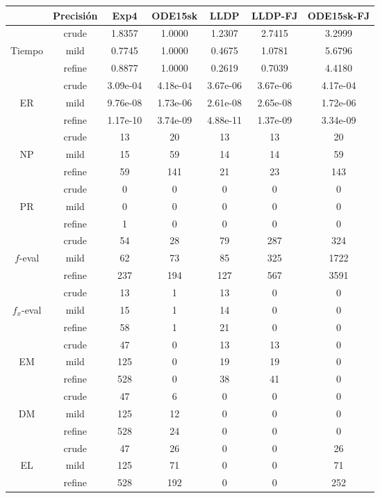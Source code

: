 \begin{table}[htb]
	\centering
\begin{tabular}{ |c|c|c|c|c|c|c| }
\hline
 & Precisi\'on & Exp4 & ODE15sk & LLDP & LLDP-FJ & ODE15sk-FJ \\
\hline
  & crude & 1.8357 & 1.0000 & 1.2307 & 2.7415 & 3.2999 \\
 Tiempo  & mild & 0.7745 & 1.0000 & 0.4675 & 1.0781 & 5.6796 \\
  & refine & 0.8877 & 1.0000 & 0.2619 & 0.7039 & 4.4180 \\
\hline
  & crude & 3.09e-04 & 4.18e-04 & 3.67e-06 & 3.67e-06 & 4.17e-04 \\
 ER  & mild & 9.76e-08 & 1.73e-06 & 2.61e-08 & 2.65e-08 & 1.72e-06 \\
  & refine & 1.17e-10 & 3.74e-09 & 4.88e-11 & 1.37e-09 & 3.34e-09 \\
\hline
  & crude & 13 & 20 & 13 & 13 & 20 \\
 NP  & mild & 15 & 59 & 14 & 14 & 59 \\
  & refine & 59 & 141 & 21 & 23 & 143 \\
\hline
  & crude & 0 & 0 & 0 & 0 & 0 \\
 PR  & mild & 0 & 0 & 0 & 0 & 0 \\
  & refine & 1 & 0 & 0 & 0 & 0 \\
\hline
  & crude & 54 & 28 & 79 & 287 & 324 \\
 $f$-eval  & mild & 62 & 73 & 85 & 325 & 1722 \\
  & refine & 237 & 194 & 127 & 567 & 3591 \\
\hline
  & crude & 13 & 1 & 13 & 0 & 0 \\
 $f_x$-eval  & mild & 15 & 1 & 14 & 0 & 0 \\
  & refine & 58 & 1 & 21 & 0 & 0 \\
\hline
  & crude & 47 & 0 & 13 & 13 & 0 \\
 EM  & mild & 125 & 0 & 19 & 19 & 0 \\
  & refine & 528 & 0 & 38 & 41 & 0 \\
\hline
  & crude & 47 & 6 & 0 & 0 & 0 \\
 DM  & mild & 125 & 12 & 0 & 0 & 0 \\
  & refine & 528 & 24 & 0 & 0 & 0 \\
\hline
  & crude & 47 & 26 & 0 & 0 & 26 \\
 EL  & mild & 125 & 71 & 0 & 0 & 71 \\
  & refine & 528 & 192 & 0 & 0 & 252 \\
\hline

\end{tabular}
\end{table}
